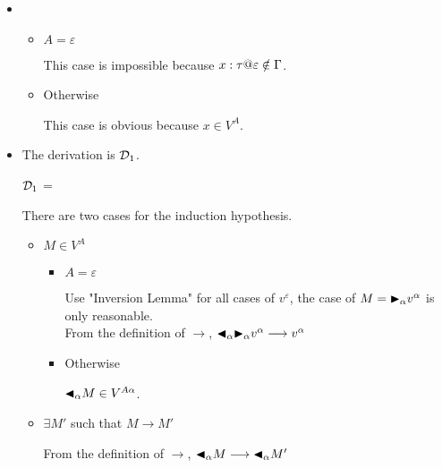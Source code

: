 \begin{itemize}
	\item \TVar
	      \begin{itemize}
	      	\item $ A = \varepsilon$
	      	      	      	      
	      	      This case is impossible because $x:\tau@\varepsilon \notin \G$.
	      	\item Otherwise
	      	      	      	      
	      	      This case is obvious because $x \in V^A$.
	      \end{itemize}
	      	      
	\item \TTBL
	      	      
	      The derivation is $\mathcal{D}_1$.
	      	      
	      $\mathcal{D}_1$ = 
	      {}
	      	      
	      There are two cases for the induction hypothesis.
	      	      
	      \begin{itemize}
	      		      	
	      	\item $ M \in V^A $
	      	      	      	      
	      	      \begin{itemize}
	      	      	\item $ A = \varepsilon $
	      	      	      	      	      	      
	      	      	      Use "Inversion Lemma" for all cases of $v^\varepsilon$, the case of $ M = {\mathop{\blacktriangleright}}_\alpha v^\alpha $ is only reasonable.\\
	      	      	      From the definition of $ \longrightarrow $, ${\mathop{\blacktriangleleft}}_\alpha {\mathop{\blacktriangleright}}_\alpha v^\alpha \longrightarrow v^\alpha$
	      	      	      	      	      	      
	      	      	\item Otherwise
	      	      	      	      	      	      
	      	      	      $ {\mathop{\blacktriangleleft}}_\alpha M \in V^{A\alpha}$.
	      	      \end{itemize}
	      	      	      	      
	      	\item $\exists M'$ such that $M \longrightarrow M'$
	      	      	      	      
	      	      From the definition of $ \longrightarrow $, ${\mathop{\blacktriangleleft}}_\alpha M \longrightarrow {\mathop{\blacktriangleleft}}_\alpha M'$
	      	      	      	      

\end{itemize}
\end{itemize}
